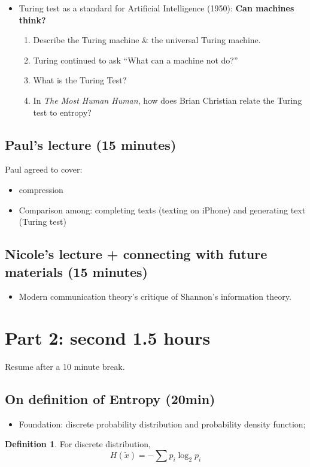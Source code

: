 \documentclass[12pt]{article}
\theoremstyle{definition}
\newtheorem{definition}[theorem]{Definition}
\theoremstyle{plain}
\begin{document}
\begin{itemize}
\begin{itemize}
        \end{itemize}
    \item Turing test as a standard for Artificial Intelligence (1950):
        \textbf{Can machines think?}
        \begin{enumerate}
            \item Describe the Turing machine & the universal Turing machine.
            \item Turing continued to ask “What can a machine not do?”
            \item What is the Turing Test?
            \item In \emph{The Most Human Human}, how does Brian Christian relate the Turing test to entropy?
        \end{enumerate}
\end{itemize}

\subsection{Paul's lecture (15 minutes)}
Paul agreed to cover:
\begin{itemize}
    \item compression
    \item Comparison among: completing texts (texting on iPhone) and generating
        text (Turing test)
\end{itemize}



\subsection{Nicole's lecture + connecting with future materials (15 minutes)}
\begin{itemize}
    \item Modern communication theory's critique of Shannon's information
        theory.
\end{itemize}

\section{Part 2: second 1.5 hours}
Resume after a 10 minute break.
\subsection{On definition of Entropy (20min) }
        \begin{itemize}
            \item Foundation: discrete probability distribution and probability density function;
        \end{itemize}
\begin{definition}
    For discrete distribution,
    \[
        H(\tilde x) = - \sum p_i \log_{2} p_i
    \]
\end{definition}
\end{document}

